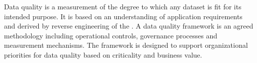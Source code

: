 %
%
Data quality is a measurement of the degree to which any dataset is fit for its intended purpose.
It is based on an understanding of application requirements and derived by reverse engineering of the
.
A data quality framework is an agreed methodology including operational controls, governance processes and
measurement mechanisms.
The framework is designed to support organizational priorities for data quality based on criticality and business value.

